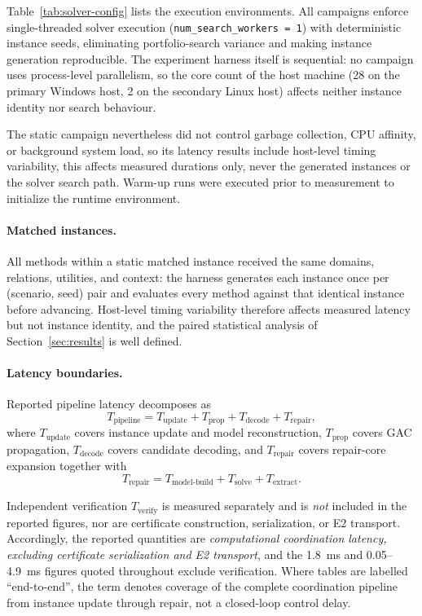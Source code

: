 \documentclass[pdflatex,sn-mathphys-num,iicol,oneside]{sn-jnl}
\newcommand{\gac}{\textsc{GAC}\xspace}
\begin{document}
Table~\ref{tab:solver-config} lists the execution environments. All
campaigns enforce single-threaded solver execution
(\texttt{num\_search\_workers = 1}) with deterministic instance
seeds, eliminating portfolio-search variance and making instance
generation reproducible. The experiment harness itself is sequential:
no campaign uses process-level parallelism, so the core count of the
host machine (28 on the primary Windows host, 2 on the secondary
Linux host) affects neither instance identity nor search behaviour.

The static campaign nevertheless did not control garbage collection,
CPU affinity, or background system load, so its latency results
include host-level timing variability, this affects measured
durations only, never the generated instances or the solver search
path. Warm-up runs were executed prior to measurement to initialize
the runtime environment.

\paragraph{Matched instances.}
All methods within a static matched instance received the same
domains, relations, utilities, and context: the harness generates
each instance once per (scenario, seed) pair and evaluates every
method against that identical instance before advancing. Host-level
timing variability therefore affects measured latency but not
instance identity, and the paired statistical analysis of
Section~\ref{sec:results} is well defined.

\paragraph{Latency boundaries.}
Reported pipeline latency decomposes as
\begin{equation}
T_{\mathrm{pipeline}}
=
T_{\mathrm{update}}
+T_{\mathrm{prop}}
+T_{\mathrm{decode}}
+T_{\mathrm{repair}},
\label{eq:latency-decomp}
\end{equation}
where $T_{\mathrm{update}}$ covers instance update and model
reconstruction, $T_{\mathrm{prop}}$ covers \gac propagation,
$T_{\mathrm{decode}}$ covers candidate decoding, and
$T_{\mathrm{repair}}$ covers repair-core expansion together with
\begin{equation}
T_{\mathrm{repair}}
=
T_{\mathrm{model\text{-}build}}
+T_{\mathrm{solve}}
+T_{\mathrm{extract}}.
\end{equation}

Independent verification $T_{\mathrm{verify}}$ is measured
separately and is \emph{not} included in the reported figures, nor
are certificate construction, serialization, or E2 transport.
Accordingly, the reported quantities are \emph{computational
coordination latency, excluding certificate serialization and E2
transport}, and the 1.8~ms and 0.05--4.9~ms figures quoted
throughout exclude verification. Where tables are labelled
``end-to-end'', the term denotes coverage of the complete
coordination pipeline from instance update through repair, not a
closed-loop control delay.
\end{document}
